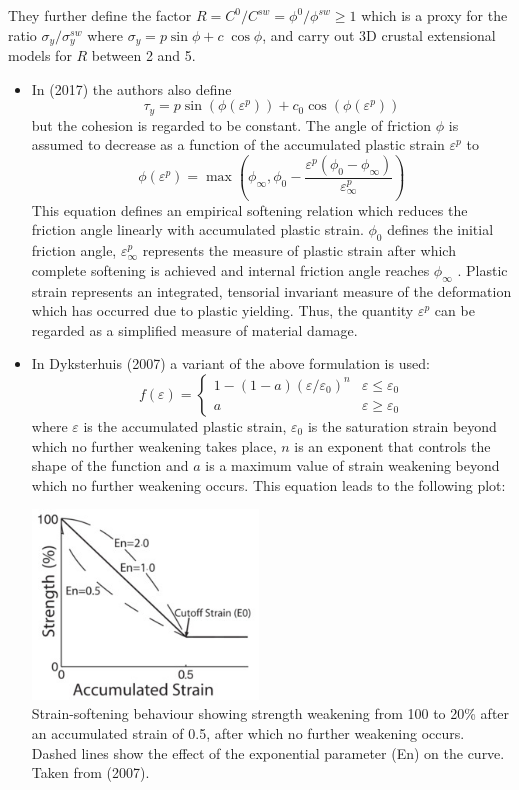 They further define the factor $R=C^0/C^{sw}=\phi^0/\phi^{sw}\geq 1$ which is a proxy
for the ratio $\sigma_y/\sigma_y^{sw}$ where $\sigma_y=p \sin\phi + c \; \cos \phi$, 
and carry out 3D crustal extensional models for $R$ between 2 and 5. 


\begin{itemize}
\item In \textcite{lemh17} (2017) the authors also define 
\[
\tau_y = p \sin (\phi(\varepsilon^p))  + c_0 \cos(\phi(\varepsilon^p))
\]
but the cohesion is regarded to be constant. 
The angle of friction $\phi$ is assumed to decrease as a function of the accumulated plastic
strain $\varepsilon^p$ to
\[
\phi(\varepsilon^p) 
=
\max \left(
\phi_\infty , \phi_0 - \frac{\varepsilon^p (\phi_0-\phi_\infty)}{\varepsilon^p_\infty}
\right)
\]
This equation defines an empirical softening relation which reduces the
friction angle linearly with accumulated plastic strain.
$\phi_0$ defines the initial friction angle, $\varepsilon^p_\infty$
represents the measure of plastic strain after which complete softening is achieved and internal
friction angle reaches $\phi_\infty$ . Plastic strain represents an integrated,
tensorial invariant measure of the deformation which has occurred
due to plastic yielding. Thus, the quantity $\varepsilon^p$ can be regarded as
a simplified measure of material damage. 


\item In Dyksterhuis \etal \textcite{dyrm07} (2007) a variant of the above formulation is used:
\[
f(\varepsilon)=
\left\{
\begin{array}{cc} 
1-(1-a)(\varepsilon/\varepsilon_0)^n & \varepsilon \leq \varepsilon_0 \\
a &  \varepsilon \geq \varepsilon_0 
\end{array}
\right.
\]
where $\varepsilon$ is the accumulated plastic strain, $\varepsilon_0$ is the
saturation strain beyond which no further weakening
takes place, $n$ is an exponent that controls the shape
of the function and $a$ is a maximum value of strain
weakening beyond which no further weakening
occurs. This equation leads to the following plot:

\begin{center}
\includegraphics[width=6cm]{images/strainweakening/dyrm07}\\
{\captionfont Strain-softening behaviour showing strength weakening from 100 to 20\% 
after an accumulated strain of 0.5, after which no further weakening occurs. 
Dashed lines show the effect of the exponential parameter
(En) on the curve. Taken from \textcite{dyrm07} (2007).}
\end{center}


\end{itemize}
